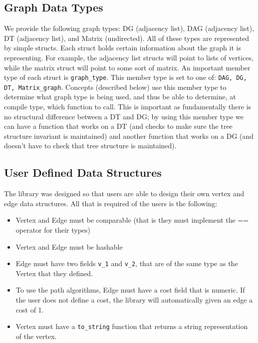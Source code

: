\documentclass{article}
\begin{document}
\subsection{Graph Data Types}
We provide the following graph types: DG (adjacency list), DAG (adjacency list), DT (adjacency list), and Matrix (undirected). All of these types are represented by simple structs. Each struct holds certain information about the graph it is representing. For example, the adjacency list structs will point to lists of vertices, while the matrix struct will point to some sort of matrix. An important member type of each struct is \texttt{graph\_type}. This member type is set to one of: \texttt{DAG, DG, DT, Matrix\_graph}. Concepts (described below) use this member type to determine what graph type is being used, and thus be able to determine, at compile type, which function to call. This is important as fundamentally there is no structural difference between a DT and DG; by using this member type we can have a function that works on a DT (and checks to make sure the tree structure invariant is maintained) and another function that works on a DG (and doesn't have to check that tree structure is maintained).

\subsection{User Defined Data Structures}
The library was designed so that users are able to design their own vertex and edge data structures. All that is required of the users is the following:
\begin{itemize}
\item Vertex and Edge must be comparable (that is they must implement the == operator for their types)
\item Vertex and Edge must be hashable
\item Edge must have two fields \texttt{v\_1} and \texttt{v\_2}, that are of the same type as the Vertex that they defined.
\item To use the path algorithms, Edge must have a cost field that is numeric. If the user does not define a cost, the library will automatically given an edge a cost of 1.
\item Vertex must have a \texttt{to\_string} function that returns a string representation of the vertex. 
\end{itemize}
\end{document}
